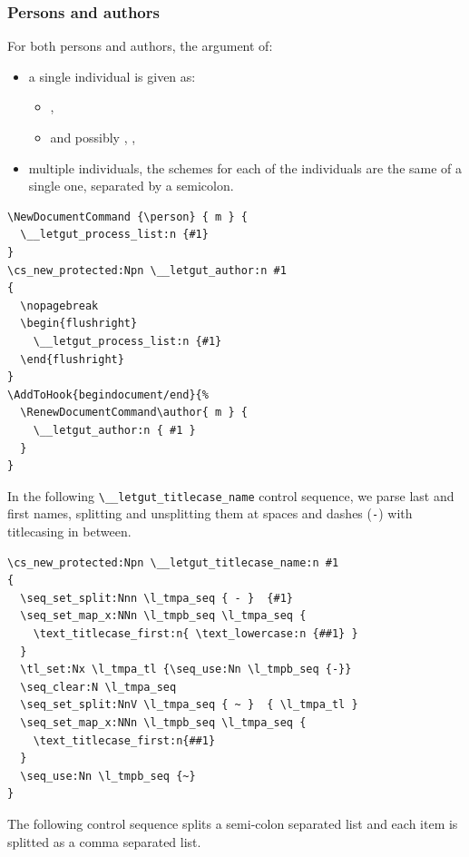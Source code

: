 \documentclass{letgut}
\begin{document}
\subsubsection{Persons and authors}
\label{sec:org73bd77f}

For both persons and authors, the argument of:
\begin{itemize}
\item a single individual is given as:
\begin{itemize}
\item {}, 
\item and possibly , , 
\end{itemize}
\item multiple individuals, the schemes for each of the individuals are the same of
a single one, separated by a semicolon.
\end{itemize}

\begin{lstlisting}
\NewDocumentCommand {\person} { m } {
  \__letgut_process_list:n {#1}
}
\cs_new_protected:Npn \__letgut_author:n #1
{
  \nopagebreak
  \begin{flushright}
    \__letgut_process_list:n {#1}
  \end{flushright}
}
\AddToHook{begindocument/end}{%
  \RenewDocumentCommand\author{ m } {
    \__letgut_author:n { #1 }
  }
}
\end{lstlisting}

In the following \lstinline+\__letgut_titlecase_name+ control sequence, we parse last and
first names, splitting and unsplitting them at spaces and dashes (\lstinline+-+) with
titlecasing in between.

\begin{lstlisting}
\cs_new_protected:Npn \__letgut_titlecase_name:n #1
{
  \seq_set_split:Nnn \l_tmpa_seq { - }  {#1}
  \seq_set_map_x:NNn \l_tmpb_seq \l_tmpa_seq {
    \text_titlecase_first:n{ \text_lowercase:n {##1} }
  }
  \tl_set:Nx \l_tmpa_tl {\seq_use:Nn \l_tmpb_seq {-}}
  \seq_clear:N \l_tmpa_seq
  \seq_set_split:NnV \l_tmpa_seq { ~ }  { \l_tmpa_tl }
  \seq_set_map_x:NNn \l_tmpb_seq \l_tmpa_seq {
    \text_titlecase_first:n{##1}
  }
  \seq_use:Nn \l_tmpb_seq {~}
}
\end{lstlisting}

The following control sequence splits a semi-colon separated list and each item
is splitted as a comma separated list.
\end{document}
